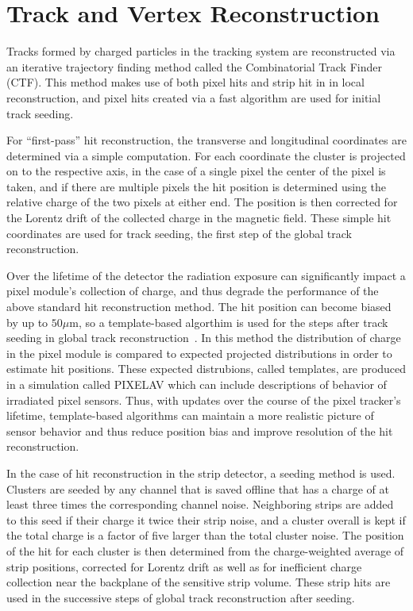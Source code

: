 \section{Track and Vertex Reconstruction}
\label{trackreco}

Tracks formed by charged particles in the tracking system are reconstructed via an iterative trajectory finding method called the Combinatorial Track Finder (CTF).  This method makes use of both pixel hits and strip hit in in local reconstruction, and pixel hits created via a fast algorithm are used for initial track seeding.  

For ``first-pass'' hit reconstruction, the transverse and longitudinal coordinates are determined via a simple computation.  For each coordinate the cluster is projected on to the respective axis, in the case of a single pixel the center of the pixel is taken, and if there are multiple pixels the hit position is determined using the relative charge of the two pixels at either end.  The position is then corrected for the Lorentz drift of the collected charge in the magnetic field.  These simple hit coordinates are used for track seeding, the first step of the global track reconstruction.  

Over the lifetime of the detector the radiation exposure can significantly impact a pixel module's collection of charge, and thus degrade the performance of the above standard hit reconstruction method.  The hit position can become biased by up to $50 \mu\text{m}$, so a template-based algorthim is used for the steps after track seeding in global track reconstruction~\cite{TrackReco}.  In this method the distribution of charge in the pixel module is compared to expected projected distributions in order to estimate hit positions.  These expected distrubions, called templates, are produced in a simulation called PIXELAV which can include descriptions of behavior of irradiated pixel sensors.  Thus, with updates over the course of the pixel tracker's lifetime, template-based algorithms can maintain a more realistic picture of sensor behavior and thus reduce position bias and improve resolution of the hit reconstruction.  

In the case of hit reconstruction in the strip detector, a seeding method is used.  Clusters are seeded by any channel that is saved offline that has a charge of at least three times the corresponding channel noise.  Neighboring strips are added to this seed if their charge it twice their strip noise, and a cluster overall is kept if the total charge is a factor of five larger than the total cluster noise.  The position of the hit for each cluster is then determined from the charge-weighted average of strip positions, corrected for Lorentz drift as well as for inefficient charge collection near the backplane of the sensitive strip volume.  These strip hits are used in the successive steps of global track reconstruction after seeding.


